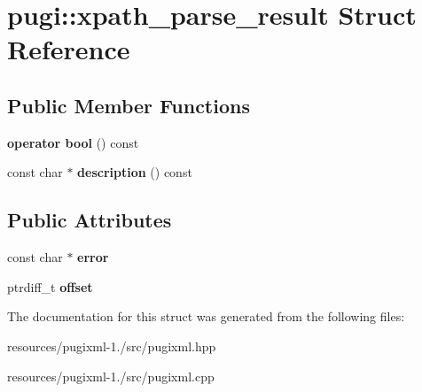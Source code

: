 \hypertarget{structpugi_1_1xpath__parse__result}{\section{pugi\+:\+:xpath\+\_\+parse\+\_\+result Struct Reference}
\label{structpugi_1_1xpath__parse__result}
}
\subsection*{Public Member Functions}
\begin{DoxyCompactItemize}
\item 
\hypertarget{structpugi_1_1xpath__parse__result_a79b82e65183e2fe7e4c866afb02b07c0}{{\bfseries operator bool} () const }\label{structpugi_1_1xpath__parse__result_a79b82e65183e2fe7e4c866afb02b07c0}

\item 
\hypertarget{structpugi_1_1xpath__parse__result_a3de342b3c2c13db7ba9dafba73c06228}{const char $\ast$ {\bfseries description} () const }\label{structpugi_1_1xpath__parse__result_a3de342b3c2c13db7ba9dafba73c06228}

\end{DoxyCompactItemize}
\subsection*{Public Attributes}
\begin{DoxyCompactItemize}
\item 
\hypertarget{structpugi_1_1xpath__parse__result_ab2c625be89b995afac829012bc749fe4}{const char $\ast$ {\bfseries error}}\label{structpugi_1_1xpath__parse__result_ab2c625be89b995afac829012bc749fe4}

\item 
\hypertarget{structpugi_1_1xpath__parse__result_add47d886c654b4d8a836573b2c2a7acb}{ptrdiff\+\_\+t {\bfseries offset}}\label{structpugi_1_1xpath__parse__result_add47d886c654b4d8a836573b2c2a7acb}

\end{DoxyCompactItemize}


The documentation for this struct was generated from the following files\+:\begin{DoxyCompactItemize}
\item 
resources/pugixml-\/1./src/pugixml.\+hpp\item 
resources/pugixml-\/1./src/pugixml.\+cpp\end{DoxyCompactItemize}
